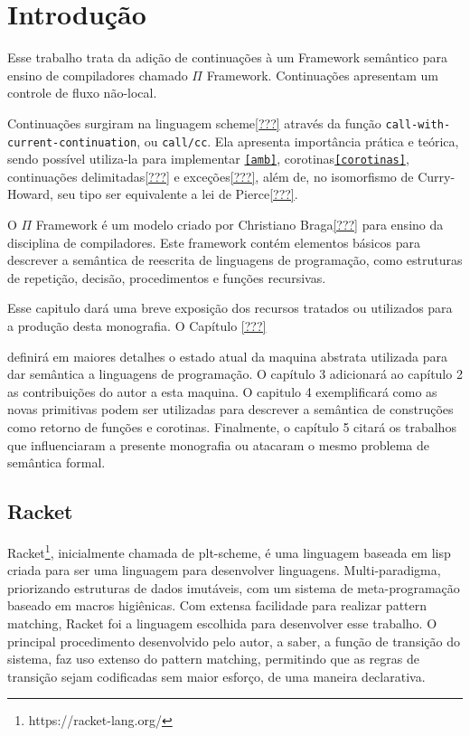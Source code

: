 \chapter{Introdução}


Esse trabalho trata da adição de continuações à um Framework semântico para ensino de compiladores chamado $\Pi$ Framework. Continuações apresentam um controle de fluxo não-local. 

Continuações surgiram na linguagem scheme\ref{???} através da função \texttt{call-with-current-continuation}, ou \texttt{call/cc}. Ela apresenta importância prática e teórica, sendo possível utiliza-la para implementar \texttt{\ref{amb}}, corotinas\texttt{\ref{corotinas}}, continuações delimitadas\ref{???} e exceções\ref{???}, além de, no isomorfismo de Curry-Howard, seu tipo ser equivalente a lei de Pierce\ref{???}.

O $\Pi$ Framework é um modelo criado por Christiano Braga\ref{???} para ensino da disciplina de compiladores. Este framework contém elementos básicos para descrever a semântica de reescrita de linguagens de programação, como estruturas de repetição, decisão, procedimentos e funções recursivas.

Esse capitulo dará uma breve exposição dos recursos tratados ou utilizados para a produção desta monografia. O Capítulo \ref{???}



definirá em maiores detalhes o estado atual da maquina abstrata utilizada para dar semântica a linguagens de programação. O capítulo 3 adicionará ao capítulo 2 as contribuições do autor a esta maquina. O capitulo 4 exemplificará como as novas primitivas podem ser utilizadas para descrever a semântica de construções como retorno de funções e corotinas. Finalmente, o capítulo 5 citará os trabalhos que influenciaram a presente monografia ou atacaram o mesmo problema de semântica formal.

\section{Racket}
Racket\footnote{https://racket-lang.org/}, inicialmente chamada de plt-scheme, é uma linguagem baseada em lisp criada para ser uma linguagem para desenvolver linguagens. Multi-paradigma, priorizando estruturas de dados imutáveis, com um sistema de meta-programação baseado em macros higiênicas. Com extensa facilidade para realizar pattern matching, Racket foi a linguagem escolhida para desenvolver esse trabalho. O principal procedimento desenvolvido pelo autor, a saber, a função de transição do sistema, faz uso extenso do pattern matching, permitindo que as regras de transição sejam codificadas sem maior esforço, de uma maneira declarativa.

